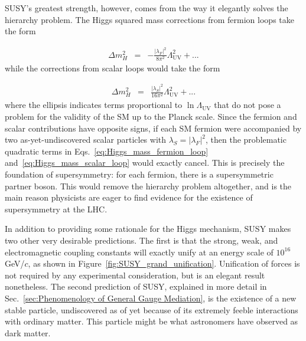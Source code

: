 \documentclass[dissertation.tex]{subfiles}
\begin{document}
SUSY's greatest strength, however, comes from the way it elegantly solves the hierarchy problem.  The Higgs squared mass corrections from fermion loops take the form \cite{SUSY_primer}

\begin{eqnarray}
\Delta m_{H}^{2} &=& -\frac{|\lambda_{F}|^{2}}{8\pi^{2}}\Lambda_{\mathrm{UV}}^{2} + ...
\label{eq:Higgs_mass_fermion_loop}
\end{eqnarray}
%
while the corrections from scalar loops would take the form \cite{SUSY_primer}

\begin{eqnarray}
\Delta m_{H}^{2} &=& \frac{|\lambda_{S}|^{2}}{16\pi^{2}}\Lambda_{\mathrm{UV}}^{2} + ...
\label{eq:Higgs_mass_scalar_loop}
\end{eqnarray}
%
where the ellipsis indicates terms proportional to $\ln\Lambda_{\mathrm{UV}}$ that do not pose a problem for the validity of the SM up to the Planck scale.  Since the fermion and scalar contributions have opposite signs, if each SM fermion were accompanied by two as-yet-undiscovered scalar particles with $\lambda_{S} = |\lambda_{F}|^{2}$, then the problematic quadratic terms in Eqs.~\ref{eq:Higgs_mass_fermion_loop} and~\ref{eq:Higgs_mass_scalar_loop} would exactly cancel.  This is precisely the foundation of supersymmetry: for each fermion, there is a supersymmetric partner boson.  This would remove the hierarchy problem altogether, and is the main reason physicists are eager to find evidence for the existence of supersymmetry at the LHC.

In addition to providing some rationale for the Higgs mechanism, SUSY makes two other very desirable predictions.  The first is that the strong, weak, and electromagnetic coupling constants will exactly unify at an energy scale of $10^{16}$ GeV/$c$, as shown in Figure~\ref{fig:SUSY_grand_unification}.  Unification of forces is not required by any experimental consideration, but is an elegant result nonetheless.  The second prediction of SUSY, explained in more detail in Sec.~\ref{sec:Phenomenology of General Gauge Mediation}, is the existence of a new stable particle, undiscovered as of yet because of its extremely feeble interactions with ordinary matter.  This particle might be what astronomers have observed as dark matter.
\end{document}
